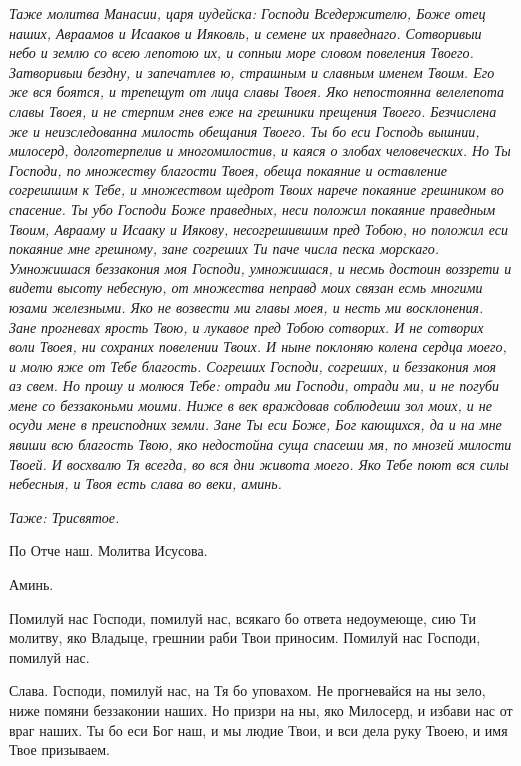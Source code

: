 \itshape Таже молитва Манасии, царя иудейска:\normalfont{} Господи Вседержителю, Боже отец наших, Авраамов и Исааков и Ияковль, и семене их праведнаго. Сотворивыи небо и землю со всею лепотою их, и сопныи море словом повеления Твоего. Затворивыи бездну, и запечатлев ю, страшным и славным именем Твоим. Его же вся боятся, и трепещут от лица славы Твоея. Яко непостоянна велелепота славы Твоея, и не стерпим гнев еже на грешники прещения Твоего. Безчислена же и неизследованна милость обещания Твоего. Ты бо еси Господь вышнии, милосерд, долготерпелив и многомилостив, и каяся о злобах человеческих. Но Ты Господи, по множеству благости Твоея, обеща покаяние и оставление согрешшим к Тебе, и множеством щедрот Твоих нарече покаяние грешником во спасение. Ты убо Господи Боже праведных, неси положил покаяние праведным Твоим, Аврааму и Исааку и Иякову, несогрешившим пред Тобою, но положил еси покаяние мне грешному, зане согреших Ти паче числа песка морскаго. Умножишася беззакония моя Господи, умножишася, и несмь достоин воззрети и видети высоту небесную, от множества неправд моих связан есмь многими юзами железными. Яко не возвести ми главы моея, и несть ми восклонения. Зане прогневах ярость Твою, и лукавое пред Тобою сотворих. И не сотворих воли Твоея, ни сохраних повелении Твоих. И ныне поклоняю колена сердца моего, и молю яже от Тебе благость. Согреших Господи, согреших, и беззакония моя аз свем. Но прошу и молюся Тебе: отради ми Господи, отради ми, и не погуби мене со беззаконьми моими. Ниже в век враждовав соблюдеши зол моих, и не осуди мене в преисподних земли. Зане Ты еси Боже, Бог кающихся, да и на мне явиши всю благость Твою, яко недостойна суща спасеши мя, по мнозей милости Твоей. И восхвалю Тя всегда, во вся дни живота моего. Яко Тебе поют вся силы небесныя, и Твоя есть слава во веки, аминь.


\itshape Таже: Трисвятое. 

По Отче наш. Молитва Исусова.\normalfont{}

Аминь.




Помилуй нас Господи, помилуй нас, всякаго бо ответа недоумеюще, сию Ти молитву, яко Владыце, грешнии раби Твои приносим. Помилуй нас Господи, помилуй нас.

Слава. Господи, помилуй нас, на Тя бо уповахом. Не прогневайся на ны зело, ниже помяни беззаконии наших. Но призри на ны, яко Милосерд, и избави нас от враг наших. Ты бо еси Бог наш, и мы людие Твои, и вси дела руку Твоею, и имя Твое призываем.

